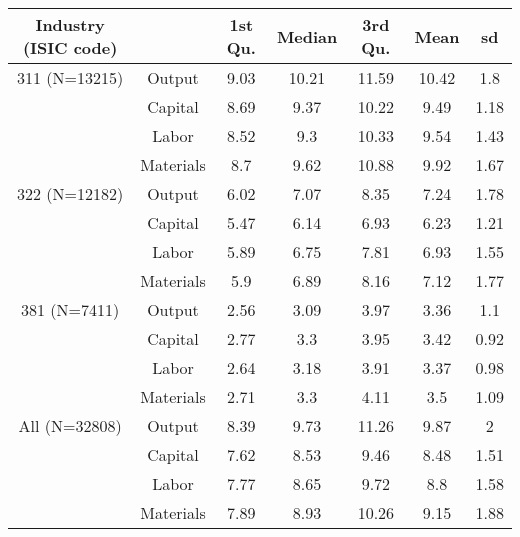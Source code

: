 \begin{table}[H]
\centering
\begin{tabular}{ccccccc}
  \hline\hline Industry (ISIC code) &   & 1st Qu. & Median & 3rd Qu. & Mean & sd \\ 
  \hline
311 (N=13215) & Output & 9.03 & 10.21 & 11.59 & 10.42 & 1.8 \\ 
   & Capital & 8.69 & 9.37 & 10.22 & 9.49 & 1.18 \\ 
   & Labor & 8.52 & 9.3 & 10.33 & 9.54 & 1.43 \\ 
   & Materials & 8.7 & 9.62 & 10.88 & 9.92 & 1.67 \\ 
  322 (N=12182) & Output & 6.02 & 7.07 & 8.35 & 7.24 & 1.78 \\ 
   & Capital & 5.47 & 6.14 & 6.93 & 6.23 & 1.21 \\ 
   & Labor & 5.89 & 6.75 & 7.81 & 6.93 & 1.55 \\ 
   & Materials & 5.9 & 6.89 & 8.16 & 7.12 & 1.77 \\ 
  381 (N=7411) & Output & 2.56 & 3.09 & 3.97 & 3.36 & 1.1 \\ 
   & Capital & 2.77 & 3.3 & 3.95 & 3.42 & 0.92 \\ 
   & Labor & 2.64 & 3.18 & 3.91 & 3.37 & 0.98 \\ 
   & Materials & 2.71 & 3.3 & 4.11 & 3.5 & 1.09 \\ 
  All (N=32808) & Output & 8.39 & 9.73 & 11.26 & 9.87 & 2 \\ 
   & Capital & 7.62 & 8.53 & 9.46 & 8.48 & 1.51 \\ 
   & Labor & 7.77 & 8.65 & 9.72 & 8.8 & 1.58 \\ 
   & Materials & 7.89 & 8.93 & 10.26 & 9.15 & 1.88 \\ 
   \hline
\end{tabular}
\end{table}
